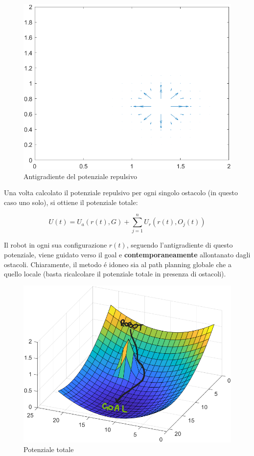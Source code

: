 \documentclass[14pt,twoside,a4paper]{extarticle}
\begin{document}
\begin{description}
\begin{figure}[H]
\caption{Antigradiente del potenziale repulsivo}
\label{antigradR}
\includegraphics[width=\textwidth]{antigradR.png}
\end{figure}
\end{description}

Una volta calcolato il potenziale repulsivo per ogni singolo ostacolo (in questo caso uno solo), si ottiene il potenziale totale:

\begin{equation}
U(t) = U_a(r(t),G) + \sum_{j=1}^{n} U_r(r(t),O_j(t))
\end{equation}

Il robot in ogni sua configurazione \(r(t)\), seguendo l'antigradiente di questo potenziale, viene guidato verso il goal e \textbf{contemporaneamente} allontanato dagli ostacoli. Chiaramente, il metodo é idoneo sia al path planning globale che a quello locale (basta ricalcolare il potenziale totale in presenza di ostacoli).

\begin{figure}[H]
\caption{Potenziale totale}
\label{pot}
\includegraphics[width=\textwidth]{pot.png}
\end{figure}
\end{document}
